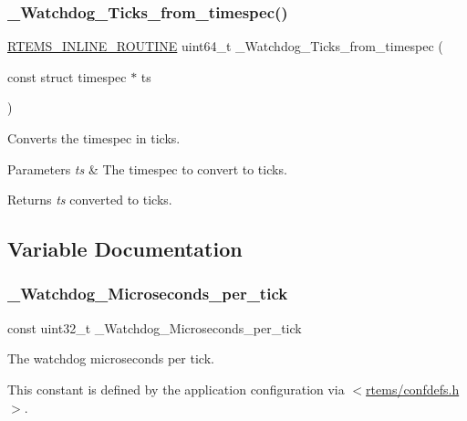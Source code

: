 \subsubsection{\texorpdfstring{\_Watchdog\_Ticks\_from\_timespec()}{\_Watchdog\_Ticks\_from\_timespec()}}
{\footnotesize\ttfamily \mbox{\hyperlink{group__RTEMSScoreBaseDefs_gac216239df231d5dbd15e3520b0b9313f}{R\+T\+E\+M\+S\+\_\+\+I\+N\+L\+I\+N\+E\+\_\+\+R\+O\+U\+T\+I\+NE}} uint64\+\_\+t \+\_\+\+Watchdog\+\_\+\+Ticks\+\_\+from\+\_\+timespec (\begin{DoxyParamCaption}\item[{const struct timespec $\ast$}]{ts }\end{DoxyParamCaption})}



Converts the timespec in ticks. 


\begin{DoxyParams}{Parameters}
{\em ts} & The timespec to convert to ticks.\\
\hline
\end{DoxyParams}
\begin{DoxyReturn}{Returns}
{\itshape ts} converted to ticks. 
\end{DoxyReturn}


\subsection{Variable Documentation}
\mbox{\label{group__RTEMSScoreWatchdog_ga09eaca36a90c004639781690cea24f3c}} 
\subsubsection{\texorpdfstring{\_Watchdog\_Microseconds\_per\_tick}{\_Watchdog\_Microseconds\_per\_tick}}
{\footnotesize\ttfamily const uint32\+\_\+t \+\_\+\+Watchdog\+\_\+\+Microseconds\+\_\+per\+\_\+tick}



The watchdog microseconds per tick. 

This constant is defined by the application configuration via $<$\mbox{\hyperlink{confdefs_8h}{rtems/confdefs.\+h}}$>$. \mbox{\label{group__RTEMSScoreWatchdog_ga4a7476341c14936f241f8747fa33c8c9}} 
